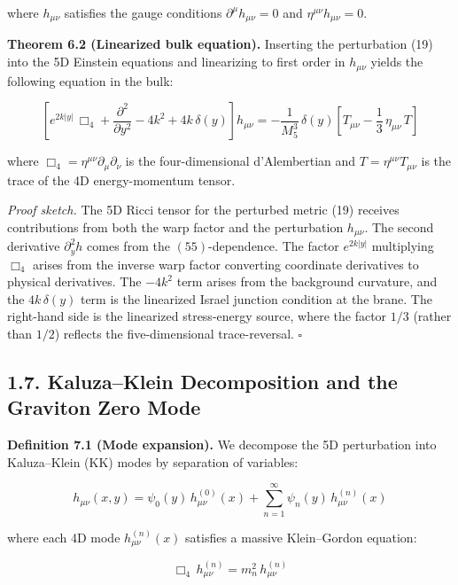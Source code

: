 \documentclass[
  11pt,
]{article}
\begin{document}
where \(h_{\mu\nu}\) satisfies the gauge conditions
\(\partial^\mu h_{\mu\nu} = 0\) and \(\eta^{\mu\nu}h_{\mu\nu} = 0\).

\textbf{Theorem 6.2 (Linearized bulk equation).} Inserting the
perturbation (19) into the 5D Einstein equations and linearizing to
first order in \(h_{\mu\nu}\) yields the following equation in the bulk:

\[\left[e^{2k|y|}\,\Box_4 + \frac{\partial^2}{\partial y^2} - 4k^2 + 4k\,\delta(y)\right] h_{\mu\nu} = -\frac{1}{M_5^3}\,\delta(y)\left[T_{\mu\nu} - \frac{1}{3}\,\eta_{\mu\nu}\,T\right] \tag{20}\]

where \(\Box_4 = \eta^{\mu\nu}\partial_\mu\partial_\nu\) is the
four-dimensional d'Alembertian and \(T = \eta^{\mu\nu}T_{\mu\nu}\) is
the trace of the 4D energy-momentum tensor.

\emph{Proof sketch.} The 5D Ricci tensor for the perturbed metric (19)
receives contributions from both the warp factor and the perturbation
\(h_{\mu\nu}\). The second derivative \(\partial_y^2 h\) comes from the
\((55)\)-dependence. The factor \(e^{2k|y|}\) multiplying \(\Box_4\)
arises from the inverse warp factor converting coordinate derivatives to
physical derivatives. The \(-4k^2\) term arises from the background
curvature, and the \(4k\,\delta(y)\) term is the linearized Israel
junction condition at the brane. The right-hand side is the linearized
stress-energy source, where the factor \(1/3\) (rather than \(1/2\))
reflects the five-dimensional trace-reversal. \(\square\)

\bigskip

\hypertarget{kaluzaklein-decomposition-and-the-graviton-zero-mode}{%
\subsection{1.7. Kaluza--Klein Decomposition and the Graviton Zero
Mode}\label{kaluzaklein-decomposition-and-the-graviton-zero-mode}}

\textbf{Definition 7.1 (Mode expansion).} We decompose the 5D
perturbation into Kaluza--Klein (KK) modes by separation of variables:

\[h_{\mu\nu}(x, y) = \psi_0(y)\,h_{\mu\nu}^{(0)}(x) + \sum_{n=1}^{\infty} \psi_n(y)\,h_{\mu\nu}^{(n)}(x) \tag{21}\]

where each 4D mode \(h_{\mu\nu}^{(n)}(x)\) satisfies a massive
Klein--Gordon equation:

\[\Box_4\,h_{\mu\nu}^{(n)} = m_n^2\,h_{\mu\nu}^{(n)} \tag{22}\]
\end{document}
